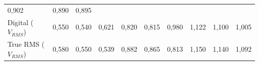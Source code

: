 \documentclass[14pt, oneside]{book}
\theoremstyle{definition}
\begin{document}
\begin{table}[H]
{\begin{tabular}{ l l l l l l l l l l }
                            \multicolumn{1}{p{0.783cm}|}{0,902 \centering } &
                            \multicolumn{1}{p{0.933cm}|}{0,890 \centering } &
                            \multicolumn{1}{p{0.933cm}|}{0,895 \centering }
                      \\  
                        \cline{1-1}\cline{2-2}\cline{3-3}\cline{4-4}\cline{5-5}\cline{6-6}\cline{7-7}\cline{8-8}\cline{9-9}\cline{10-10}  
                            \multicolumn{1}{|p{3.033cm}|}{Digital ($V_{RMS}$) \centering } &
                            \multicolumn{1}{p{1.367cm}|}{0,550 \centering } &
                            \multicolumn{1}{p{1.333cm}|}{0,540 \centering } &
                            \multicolumn{1}{p{1.000cm}|}{0,621 \centering } &
                            \multicolumn{1}{p{1.350cm}|}{0,820 \centering } &
                            \multicolumn{1}{p{1.050cm}|}{0,815 \centering } &
                            \multicolumn{1}{p{0.983cm}|}{0,980 \centering } &
                            \multicolumn{1}{p{0.783cm}|}{1,122 \centering } &
                            \multicolumn{1}{p{0.933cm}|}{1,100 \centering } &
                            \multicolumn{1}{p{0.933cm}|}{1,005 \centering }
                      \\  
                        \cline{1-1}\cline{2-2}\cline{3-3}\cline{4-4}\cline{5-5}\cline{6-6}\cline{7-7}\cline{8-8}\cline{9-9}\cline{10-10}  
                            \multicolumn{1}{|p{3.033cm}|}{True RMS ($V_{RMS}$) \centering } &
                            \multicolumn{1}{p{1.367cm}|}{0,580 \centering } &
                            \multicolumn{1}{p{1.333cm}|}{0,550 \centering } &
                            \multicolumn{1}{p{1.000cm}|}{0,539 \centering } &
                            \multicolumn{1}{p{1.350cm}|}{0,882 \centering } &
                            \multicolumn{1}{p{1.050cm}|}{0,865 \centering } &
                            \multicolumn{1}{p{0.983cm}|}{0,813 \centering } &
                            \multicolumn{1}{p{0.783cm}|}{1,150 \centering } &
                            \multicolumn{1}{p{0.933cm}|}{1,140 \centering } &
                            \multicolumn{1}{p{0.933cm}|}{1,092 \centering }
                      \\  
                        \hline
                    
                    \end{tabular} }
                \end{table}
            
\end{document}
